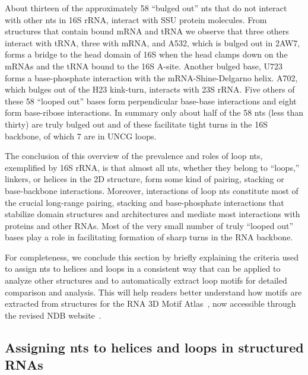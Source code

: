 About thirteen of the approximately 58 ``bulged out'' nts that do not interact
with other nts in \EC{} 16S rRNA, interact with SSU protein molecules. From
structures that contain bound mRNA and tRNA we observe that three others
interact with tRNA, three with mRNA, and A532, which is bulged out in 2AW7,
forms a bridge to the head domain of 16S when the head clamps down on the mRNAs
and the tRNA bound to the 16S A-site. Another bulged base, U723 forms a
base-phosphate interaction with the mRNA-Shine-Delgarno helix. A702, which
bulges out of the H23 kink-turn, interacts with 23S rRNA\@. Five others of these
58 ``looped out'' bases form perpendicular base-base interactions and eight form
base-ribose interactions. In summary only about half of the 58 nts (less than
thirty) are truly bulged out and of these  facilitate tight turns in the 16S
backbone, of which 7 are in UNCG loops. 

The conclusion of this overview of the prevalence and roles of loop nts,
exemplified by 16S rRNA, is that almost all nts, whether they belong to ``loops,''
linkers, or helices in the 2D structure, form some kind of pairing, stacking or
base-backbone interactions. Moreover, interactions of loop nts constitute most
of the crucial long-range pairing, stacking and base-phosphate interactions that
stabilize domain structures and architectures and mediate most interactions with
proteins and other RNAs. Most of the very small number of truly “looped out”
bases play a role in facilitating formation of sharp \degree turns in the RNA
backbone. 

For completeness, we conclude this section by briefly explaining the criteria
used to assign nts to helices and loops in a consistent way that can be applied
to analyze other structures and to automatically extract loop motifs for
detailed comparison and analysis.  This will help readers better understand how
motifs are extracted from structures for the RNA 3D Motif Atlas~\cite{Petrov2013}, now
accessible through the revised NDB website~\cite{CoimbatoreNarayanan2014}. 

\subsection{Assigning nts to helices and loops in structured RNAs}

